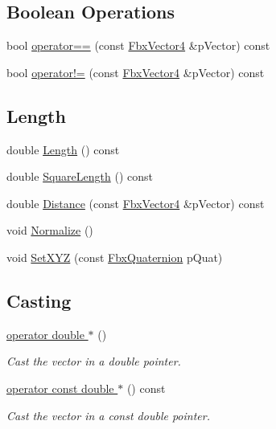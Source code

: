 \subsection*{Boolean Operations}
\begin{DoxyCompactItemize}
\item 
bool \hyperlink{class_fbx_vector4_a25462c5cdd200b19ad30e0ab4a7eac44}{operator==} (const \hyperlink{class_fbx_vector4}{Fbx\+Vector4} \&p\+Vector) const
\item 
bool \hyperlink{class_fbx_vector4_ab45035f8dd5def6b990e6e21c4f1e36d}{operator!=} (const \hyperlink{class_fbx_vector4}{Fbx\+Vector4} \&p\+Vector) const
\end{DoxyCompactItemize}
\subsection*{Length}
\begin{DoxyCompactItemize}
\item 
double \hyperlink{class_fbx_vector4_acf75b4a04b333460947133c59c57fd6b}{Length} () const
\item 
double \hyperlink{class_fbx_vector4_ad77a15ae1c7c19c49541277eed7ad578}{Square\+Length} () const
\item 
double \hyperlink{class_fbx_vector4_a7d1010f60f73f8bd3668dcf7827421b2}{Distance} (const \hyperlink{class_fbx_vector4}{Fbx\+Vector4} \&p\+Vector) const
\item 
void \hyperlink{class_fbx_vector4_a4eb04e00042eb1b067fabc4c581256ae}{Normalize} ()
\item 
void \hyperlink{class_fbx_vector4_a7ab1f65620a8cbfb59bf4e999bebf99e}{Set\+X\+YZ} (const \hyperlink{class_fbx_quaternion}{Fbx\+Quaternion} p\+Quat)
\end{DoxyCompactItemize}
\subsection*{Casting}
\begin{DoxyCompactItemize}
\item 
\hyperlink{class_fbx_vector4_aa8d485453c0a2b9160eff2fb2c6c6a02}{operator double $\ast$} ()
\begin{DoxyCompactList}\small\item\em Cast the vector in a double pointer. \end{DoxyCompactList}\item 
\hyperlink{class_fbx_vector4_a9be3dde6c582dc5b74f315fa7b6b941f}{operator const double $\ast$} () const
\begin{DoxyCompactList}\small\item\em Cast the vector in a const double pointer. \end{DoxyCompactList}\end{DoxyCompactItemize}
